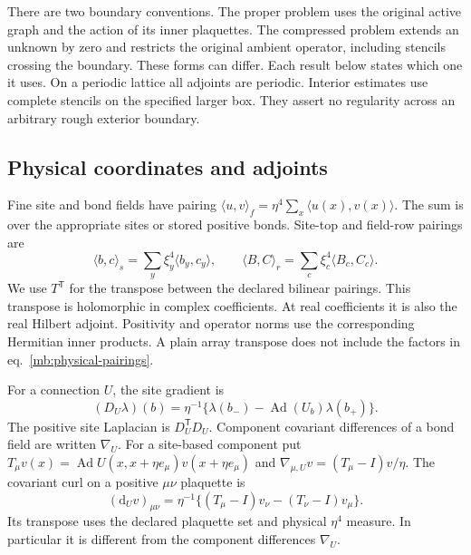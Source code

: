 \documentclass[11pt,letterpaper,reqno]{amsart}
\numberwithin{equation}{section}
\renewcommand{\eqref}[1]{\textup{eq.~\ref{#1}}}
\theoremstyle{definition}
\theoremstyle{remark}
\begin{document}
There are two boundary conventions. The proper problem uses the
original active graph and the action of its inner plaquettes.
The compressed problem extends an unknown by zero and restricts
the original ambient operator, including stencils crossing the
boundary. These forms can differ. Each result below states which
one it uses. On a periodic lattice all adjoints are periodic.
Interior estimates use complete stencils on the specified larger
box. They assert no regularity across an arbitrary rough exterior
boundary.

\subsection{Physical coordinates and adjoints}

Fine site and bond fields have pairing
$\langle u,v\rangle_f=\eta^4\sum_x\langle u(x),v(x)\rangle$.
The sum is over the appropriate sites or stored positive bonds.
Site-top and field-row pairings are
\begin{equation}\label{mb:physical-pairings}
 \langle b,c\rangle_s=\sum_y\xi_y^4\langle b_y,c_y\rangle,
 \qquad
 \langle B,C\rangle_r=\sum_c\xi_c^4\langle B_c,C_c\rangle.
\end{equation}
We use $T^{\mathsf T}$ for the transpose between the declared
bilinear pairings. This transpose is holomorphic in complex
coefficients. At real coefficients it is also the real Hilbert
adjoint. Positivity and operator norms use the corresponding
Hermitian inner products. A plain array transpose does not
include the factors in \eqref{mb:physical-pairings}.

For a connection $U$, the site gradient is
\begin{equation}\label{mb:gradient}
 (D_U\lambda)(b)=\eta^{-1}
       \{\lambda(b_-)-\operatorname{Ad}(U_b)\lambda(b_+)\}.
\end{equation}
The positive site Laplacian is $D_U^{\mathsf T}D_U$. Component
covariant differences of a bond field are written $\nabla_U$.
For a site-based component put
$T_\mu v(x)=\operatorname{Ad}U(x,x+\eta e_\mu)v(x+\eta e_\mu)$ and $\nabla_{\mu,U}v=(T_\mu-I)v/\eta$.
The covariant curl on a positive $\mu\nu$ plaquette is
\begin{equation}\label{mb:curl}
 (\mathrm d_Uv)_{\mu\nu}
    =\eta^{-1}\{(T_\mu-I)v_\nu-(T_\nu-I)v_\mu\}.
\end{equation}
Its transpose uses the declared plaquette set and physical
$\eta^4$ measure. In particular it is different from the
component differences $\nabla_U$.
\end{document}
